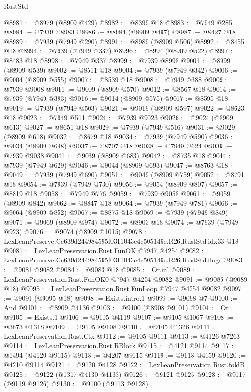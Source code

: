 \begin{lexlean}{RustStd}
\begin{coremodule}
@8981 := @8979 (@8909 @429)
@8982 := @8399 @18
@8983 := @7949 @285
@8984 := @7939 @8983
@8986 := @8984 (@8909 @497)
@8987 := @8427 @18
@8989 := @7939 (@7949 @290)
@8991 := @8989 (@8909 @506)
@8992 := @8455 @18
@8994 := @7939 (@7949 @332)
@8996 := @8994 (@8909 @522)
@8997 := @8483 @18
@8998 := @7949 @337
@8999 := @7939 @8998
@9001 := @8999 (@8909 @539)
@9002 := @8511 @18
@9004 := @7939 (@7949 @342)
@9006 := @9004 (@8909 @555)
@9007 := @8539 @18
@9008 := @7949 @388
@9009 := @7939 @9008
@9011 := @9009 (@8909 @570)
@9012 := @8567 @18
@9014 := @7939 (@7949 @393)
@9016 := @9014 (@8909 @575)
@9017 := @8595 @18
@9019 := @7939 (@7949 @503)
@9021 := @9019 (@8909 @597)
@9022 := @8623 @18
@9023 := @7949 @511
@9024 := @7939 @9023
@9026 := @9024 (@8909 @613)
@9027 := @8651 @18
@9029 := @7939 (@7949 @516)
@9031 := @9029 (@8909 @618)
@9032 := @8679 @18
@9034 := @7939 (@7949 @590)
@9036 := @9034 (@8909 @648)
@9037 := @8707 @18
@9038 := @7949 @624
@9039 := @7939 @9038
@9041 := @9039 (@8909 @683)
@9042 := @8735 @18
@9044 := @7939 (@7949 @629)
@9046 := @9044 (@8909 @693)
@9047 := @8763 @18
@9049 := @7939 (@7949 @690)
@9051 := @9049 (@8909 @759)
@9052 := @8791 @18
@9054 := @7939 (@7949 @730)
@9056 := @9054 (@8909 @807)
@9057 := @8819 @18
@9058 := @7949 @776
@9059 := @7939 @9058
@9061 := @9059 (@8909 @842)
@9062 := @8847 @18
@9064 := @7939 (@7949 @781)
@9066 := @9064 (@8909 @852)
@9067 := @8875 @18
@9069 := @7939 (@7949 @849)
@9071 := @9069 (@8909 @974)
@9072 := @8903 @18
@9074 := @7939 (@7949 @923)
@9076 := @9074 (@8909 @1015)
@9078 := LexLeanPreserve.Cc639d244984595f0311043c4c505146e.R26.RustStd.idx33 @18
@9081 := LexLeanPreservation.Rust.FunOK @7947 @4254
@9082 := LexLeanPreserve.Cc639d244984595f0311043c4c505146e.R26.RustStd.flags
@9083 := @9081 @9082
@9084 := @9083 @18
@9085 := Or.inl
@9089 := LexLeanPreservation.Rust.FunOK0 @7947 @4254 @9082
@9091 := @9085 (@9089 @18)
@9095 := LexLeanPreservation.Rust.FunLoop @7947 @4254 @9082
@9097 := @9091 (@9095 @18)
@9098 := Exists.intro.{1}
@9099 := @9098 @7
@9100 := And
@9101 := @8909 @4136
@9103 := @9100 (@8908 @9101)
@9104 := Or
@9105 := Exists.{1}
@9106 := @9105 @4119
@9107 := @9105 @1067
@9108 := @3873 @1318
@9109 := @9105 @9108
@9110 := @9105 @1326
@9111 := LexLeanPreservation.Rust.Ctx
@9112 := @9105 @9111
@9113 := @4126 @7263
@9114 := LexLeanPreservation.Rust.RBlock
@9115 := @4121 @9114
@9117 := @1494 (@4120 @9115)
@9118 := @4207 @9115
@9119 := @9118 @4159
@9120 := @4210 @9114
@9121 := @9120 @4128
@9122 := LexLeanPreservation.Rust.foldB
@9125 := @9122 (@1317 @4130 @4133)
@9126 := @9121 @9125
@9128 := @9117 (@9119 @9126)
@9130 := @9100 (@9113 @9128)

\end{coremodule}
\end{lexlean}
